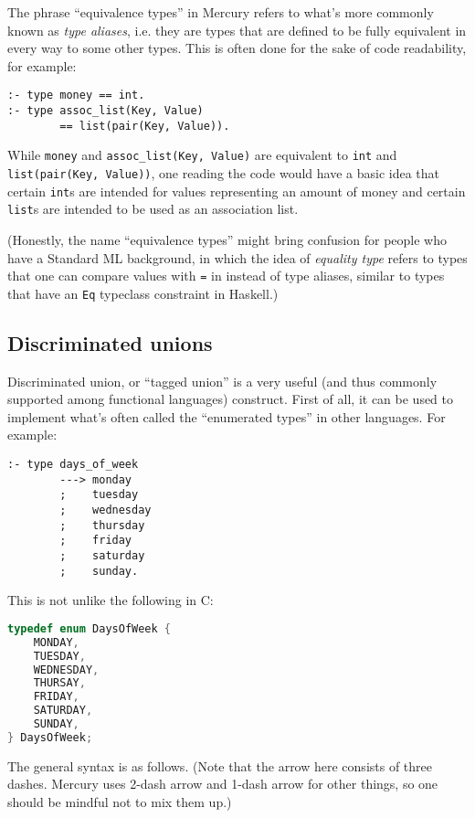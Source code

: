 The phrase ``equivalence types'' in Mercury refers to what's more commonly known as \textit{type aliases}, i.e. they are types that are defined to be fully equivalent in every way to some other types. This is often done for the sake of code readability, for example:

\begin{lstlisting}[language=Mercury]
:- type money == int.
:- type assoc_list(Key, Value)
        == list(pair(Key, Value)).
\end{lstlisting}

While \texttt{money} and \texttt{assoc\_list(Key, Value)} are equivalent to \texttt{int} and \texttt{list(pair(Key, Value))}, one reading the code would have a basic idea that certain \texttt{int}s are intended for values representing an amount of money and certain \texttt{list}s are intended to be used as an association list. 

(Honestly, the name ``equivalence types'' might bring confusion for people who have a Standard ML background, in which the idea of \textit{equality type} refers to types that one can compare values with \texttt{=} in instead of type aliases, similar to types that have an \texttt{Eq} typeclass constraint in Haskell.)

\subsection{Discriminated unions}

Discriminated union, or ``tagged union'' is a very useful (and thus commonly supported among functional languages) construct. First of all, it can be used to implement what's often called the ``enumerated types'' in other languages. For example:

\begin{lstlisting}[language=Mercury]
:- type days_of_week
        ---> monday
        ;    tuesday
        ;    wednesday
        ;    thursday
        ;    friday
        ;    saturday
        ;    sunday.
\end{lstlisting}

This is not unlike the following in C:

\begin{lstlisting}[language=C]
typedef enum DaysOfWeek {
    MONDAY,
    TUESDAY,
    WEDNESDAY,
    THURSAY,
    FRIDAY,
    SATURDAY,
    SUNDAY,
} DaysOfWeek;
\end{lstlisting}

  The general syntax is as follows. (Note that the arrow here consists of three dashes. Mercury uses 2-dash arrow and 1-dash arrow for other things, so one should be mindful not to mix them up.)
  
